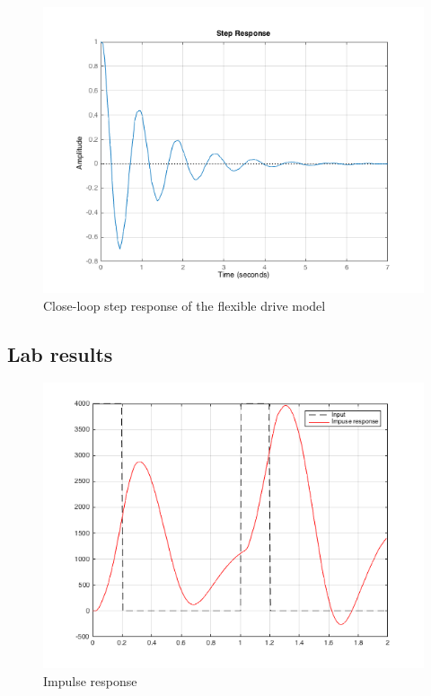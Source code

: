 \documentclass[a4paper, 12pt]{article}
\begin{document}
\begin{figure}[!htbp]
\centering
\includegraphics[scale = 0.6]{FlexibleStepResponseNoControl}
\caption{Close-loop step response of the flexible drive model}
\label{FlexibleStepResponseNoControl}
\end{figure}

\vspace{7ex}
\subsection{Lab results}
\begin{figure}[!htbp]
\centering
\includegraphics[scale = 0.6]{LabImpulseResponseNoControl}
\caption{Impulse response}
\label{LabImpulseResponseNoControl}
\end{figure}
\end{document}
